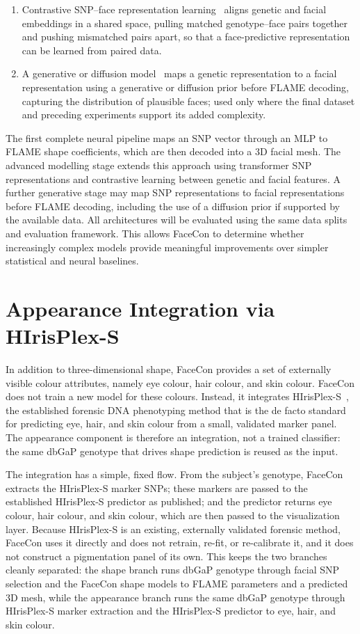 \begin{enumerate}
\item Contrastive SNP--face representation learning~\cite{ref:clip} aligns genetic and facial embeddings in a shared space, pulling matched genotype--face pairs together and pushing mismatched pairs apart, so that a face-predictive representation can be learned from paired data.
\item A generative or diffusion model~\cite{ref:ddpm,ref:ldm} maps a genetic representation to a facial representation using a generative or diffusion prior before FLAME decoding, capturing the distribution of plausible faces; used only where the final dataset and preceding experiments support its added complexity.
\end{enumerate}
The first complete neural pipeline maps an SNP vector through an MLP to FLAME shape coefficients, which are then decoded into a 3D facial mesh. The advanced modelling stage extends this approach using transformer SNP representations and contrastive learning between genetic and facial features. A further generative stage may map SNP representations to facial representations before FLAME decoding, including the use of a diffusion prior if supported by the available data. All architectures will be evaluated using the same data splits and evaluation framework. This allows FaceCon to determine whether increasingly complex models provide meaningful improvements over simpler statistical and neural baselines.

\section{Appearance Integration via HIrisPlex-S}
In addition to three-dimensional shape, FaceCon provides a set of externally visible colour attributes, namely eye colour, hair colour, and skin colour. FaceCon does not train a new model for these colours. Instead, it integrates HIrisPlex-S~\cite{ref:hirisplex,ref:hirisplexs}, the established forensic DNA phenotyping method that is the de facto standard for predicting eye, hair, and skin colour from a small, validated marker panel. The appearance component is therefore an integration, not a trained classifier: the same dbGaP genotype that drives shape prediction is reused as the input.

The integration has a simple, fixed flow. From the subject's genotype, FaceCon extracts the HIrisPlex-S marker SNPs; these markers are passed to the established HIrisPlex-S predictor as published; and the predictor returns eye colour, hair colour, and skin colour, which are then passed to the visualization layer. Because HIrisPlex-S is an existing, externally validated forensic method, FaceCon uses it directly and does not retrain, re-fit, or re-calibrate it, and it does not construct a pigmentation panel of its own. This keeps the two branches cleanly separated: the shape branch runs dbGaP genotype through facial SNP selection and the FaceCon shape models to FLAME parameters and a predicted 3D mesh, while the appearance branch runs the same dbGaP genotype through HIrisPlex-S marker extraction and the HIrisPlex-S predictor to eye, hair, and skin colour.


